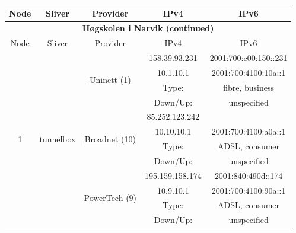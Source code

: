 \begin{small}
\begin{center}
\begin{longtable}{|c|c|c|c|c|c|c|c|}
 \multicolumn{2}{|p{8em}|}{Node} & \multicolumn{2}{|p{8em}|}{Sliver} & \multicolumn{2}{|p{8em}|}{Provider} & IPv4 & IPv6 \\ \hline
\endfirsthead
\hline
 \multicolumn{8}{|c|}{\textbf{Høgskolen i Narvik (continued)}} \\ \hline
 \multicolumn{2}{|p{8em}|}{Node} & \multicolumn{2}{|p{8em}|}{Sliver} & \multicolumn{2}{|p{8em}|}{Provider} & IPv4 & IPv6 \\ \hline
\endhead
 \multirow{12}{*}{\tiny{1}} & \multicolumn{3}{|c|}{\multirow{12}{*}{\tiny{tunnelbox}}} & \multicolumn{2}{|c|}{\multirow{4}{*}{\tiny{\href{https://www.uninett.no}{Uninett} (1)}}} & \tiny{158.39.93.231} & \tiny{2001:700:c00:150::231} \\* \cline{7-7}\cline{8-8}
  & \multicolumn{3}{|c|}{} & \multicolumn{2}{|c|}{} & \tiny{10.1.10.1} & \tiny{2001:700:4100:10a::1} \\* \cline{7-7}\cline{8-8}
  & \multicolumn{3}{|c|}{} & \multicolumn{2}{|c|}{} & Type: & fibre, business \\* \cline{7-7}\cline{8-8}
  & \multicolumn{3}{|c|}{} & \multicolumn{2}{|c|}{} & Down/Up:  & unspecified \\* \cline{5-5}\cline{6-6}\cline{7-7}\cline{8-8}
  & \multicolumn{3}{|c|}{} & \multicolumn{2}{|c|}{\multirow{4}{*}{\tiny{\href{https://www.broadnet.no}{Broadnet} (10)}}} & \tiny{85.252.123.242} & \frownie{} \\* \cline{7-7}\cline{8-8}
  & \multicolumn{3}{|c|}{} & \multicolumn{2}{|c|}{} & \tiny{10.10.10.1} & \tiny{2001:700:4100:a0a::1} \\* \cline{7-7}\cline{8-8}
  & \multicolumn{3}{|c|}{} & \multicolumn{2}{|c|}{} & Type: & ADSL, consumer \\* \cline{7-7}\cline{8-8}
  & \multicolumn{3}{|c|}{} & \multicolumn{2}{|c|}{} & Down/Up:  & unspecified \\* \cline{5-5}\cline{6-6}\cline{7-7}\cline{8-8}
  & \multicolumn{3}{|c|}{} & \multicolumn{2}{|c|}{\multirow{4}{*}{\tiny{\href{http://www.powertech.no}{PowerTech} (9)}}} & \tiny{195.159.158.174} & \tiny{2001:840:490d::174} \\* \cline{7-7}\cline{8-8}
  & \multicolumn{3}{|c|}{} & \multicolumn{2}{|c|}{} & \tiny{10.9.10.1} & \tiny{2001:700:4100:90a::1} \\* \cline{7-7}\cline{8-8}
  & \multicolumn{3}{|c|}{} & \multicolumn{2}{|c|}{} & Type: & ADSL, consumer \\* \cline{7-7}\cline{8-8}
  & \multicolumn{3}{|c|}{} & \multicolumn{2}{|c|}{} & Down/Up:  & unspecified \\ \hline

\end{longtable}
\end{center}
\end{small}
